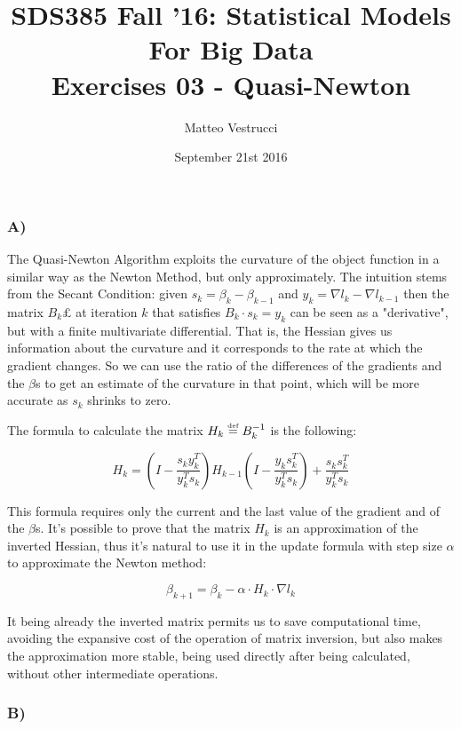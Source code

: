 \documentclass{article}
\title{SDS385 Fall '16: Statistical Models For Big Data\\Exercises 03 - Quasi-Newton}
\author{Matteo Vestrucci}
\date{September 21st 2016}
\begin{document}
\maketitle
\bigskip\bigskip\bigskip

\subsubsection*{A)}

The Quasi-Newton Algorithm exploits the curvature of the object function in a similar way as the Newton Method, but only approximately. The intuition stems from the Secant Condition: given $s_k=\beta_k-\beta_{k-1}$ and $y_k=\nabla l_k-\nabla l_{k-1}$ then the matrix $B_k£$ at iteration $k$ that satisfies $B_k \cdot s_k= y_k$ can be seen as a "derivative", but with a finite multivariate differential. That is, the Hessian gives us information about the curvature and it corresponds to the rate at which the gradient changes. So we can use the ratio of the differences of the gradients and the $\beta$s to get an estimate of the curvature in that point, which will be more accurate as $s_k$ shrinks to zero.

The formula to calculate the matrix $H_k \stackrel{\textup{\tiny def}}{=} B_k^{-1}$ is the following:

\begin{equation*}
H_{k}=\left(I-\frac{s_k y_k^T}{y_k^T s_k}\right)H_{k-1}\left(I-\frac{y_k s_k^T}{y_k^T s_k}\right)+\frac{s_k s_k^T}{y_k^T s_k}
\end{equation*}

This formula requires only the current and the last value of the gradient and of the $\beta$s. It's possible to prove that the matrix $H_k$ is an approximation of the inverted Hessian, thus it's natural to use it in the update formula with step size $\alpha$ to approximate the Newton method:

\begin{equation*}
\beta_{k+1}=\beta_k-\alpha\cdot H_k\cdot\nabla l_k
\end{equation*} 

It being already the inverted matrix permits us to save computational time, avoiding the expansive cost of the operation of matrix inversion, but also makes the approximation more stable, being used directly after being calculated, without other intermediate operations.

\subsubsection*{B)}
\end{document}
